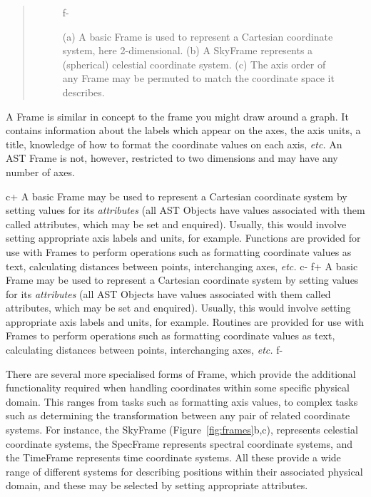 \documentclass[twoside,11pt]{article}
\begin{document}
\begin{htmlonly}
\begin{quote}
\begin{figure}
f-
   \caption{(a) A basic Frame is used to represent a Cartesian coordinate
   system, here 2-dimensional. (b) A SkyFrame represents a (spherical)
   celestial coordinate system. (c) The axis order of any Frame may be
   permuted to match the coordinate space it describes.}
   \end{figure}
   \end{quote}
\end{htmlonly}
A Frame is similar in concept to the frame you might draw around a
graph.  It contains information about the labels which appear on the
axes, the axis units, a title, knowledge of how to format the
coordinate values on each axis, {\em{etc.}}  An AST Frame is not,
however, restricted to two dimensions and may have any number of axes.

c+
A basic Frame may be used to represent a Cartesian coordinate system
by setting values for its {\em attributes} (all AST Objects have
values associated with them called attributes, which may be set and
enquired).  Usually, this would involve setting appropriate axis
labels and units, for example.  Functions are provided for use with
Frames to perform operations such as formatting coordinate values as
text, calculating distances between points, interchanging axes,
{\em{etc.}}
c-
f+
A basic Frame may be used to represent a Cartesian coordinate system
by setting values for its {\em attributes} (all AST Objects have
values associated with them called attributes, which may be set and
enquired).  Usually, this would involve setting appropriate axis
labels and units, for example.  Routines are provided for use with
Frames to perform operations such as formatting coordinate values as
text, calculating distances between points, interchanging axes,
{\em{etc.}}
f-

There are several more specialised forms of Frame, which provide the
additional functionality required when handling coordinates within some
specific physical domain. This ranges from tasks such as formatting axis
values, to complex tasks such as determining the transformation between
any pair of related coordinate systems. For instance, the SkyFrame
(Figure~\ref{fig:frames}b,c), represents celestial coordinate systems,
the SpecFrame represents spectral coordinate systems, and the TimeFrame 
represents time coordinate systems. All these provide a wide range of 
different systems for describing positions within their associated physical 
domain, and these may be selected by setting appropriate attributes.  
\end{document}
